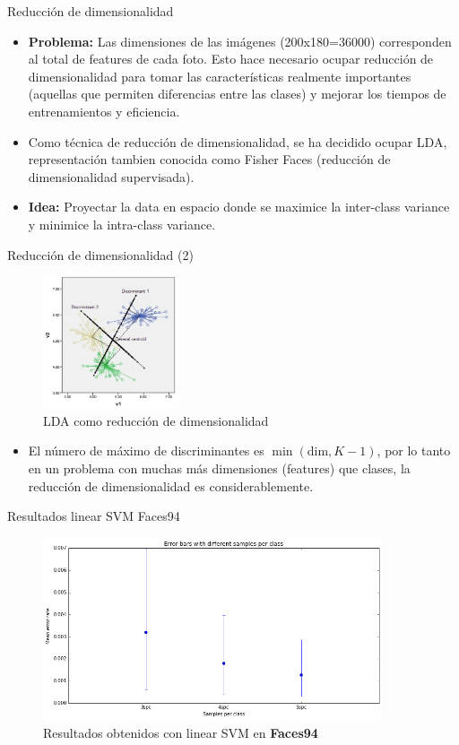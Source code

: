 \documentclass{beamer}
\begin{document}
\begin{frame}{Reducción de dimensionalidad}
\begin{itemize}
	\item \textbf{Problema:} Las dimensiones de las imágenes (200x180=36000) corresponden al total de features de cada foto. Esto hace necesario ocupar reducción de dimensionalidad para tomar las características realmente importantes (aquellas que permiten diferencias entre las clases) y mejorar los tiempos de entrenamientos y eficiencia.
	\item Como técnica de reducción de dimensionalidad, se ha decidido ocupar LDA, representación tambien conocida como Fisher Faces (reducción de dimensionalidad supervisada).
	\item \textbf{Idea:} Proyectar la data en espacio donde se maximice la inter-class variance y minimice la intra-class variance. 
\end{itemize}
\end{frame}


\begin{frame}{Reducción de dimensionalidad (2)}
\begin{figure}[htpb!]
\centering
\includegraphics[width=4cm]{fisherfaces}
\caption{LDA como reducción de dimensionalidad}
\end{figure}

\begin{itemize}
	\item El número de máximo de discriminantes es $\min(\text{dim},K-1)$, por lo tanto en un problema con muchas más dimensiones (features) que clases, la reducción de dimensionalidad es considerablemente. 
\end{itemize}
\end{frame}

\begin{frame}{Resultados linear SVM Faces94}
\begin{figure}[htpb!]
\centering
\includegraphics[width=10cm]{lsvm_res94}
\caption{Resultados obtenidos con linear SVM en \textbf{Faces94}}
\end{figure}
\end{frame}
\end{document}

